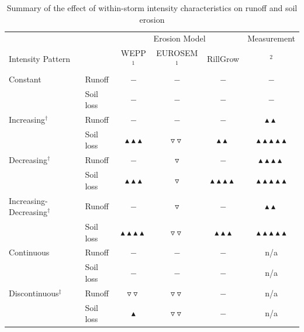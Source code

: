 \begin{table}
  \centering
  \caption{Summary of the effect of within-storm intensity characteristics on
runoff and soil erosion}
  \label{tab:SimulationSummary}
    \begin{tabular}{llcccc}
    \toprule
    & & \multicolumn{3}{c}{Erosion Model} & Measurement \\
    \cmidrule(rl){3-5} \cmidrule(rl){6-6}
    Intensity Pattern & & WEPP$^1$ & EUROSEM$^1$ & RillGrow &
\citet{parsons2006-68}$^2$\\
    \midrule
    \midrule
    Constant & Runoff & $-$ & $-$ & $-$ & $-$ \\
             & Soil loss & $-$ & $-$ & $-$ & $-$ \\
    \midrule
    Increasing$^\dagger$ & Runoff & $-$ & $-$ & $-$ &
$\blacktriangle\blacktriangle$ \\
                         & Soil loss &
$\blacktriangle\blacktriangle\blacktriangle$ & $\triangledown\triangledown$
& $\blacktriangle\blacktriangle$ &
$\blacktriangle\blacktriangle\blacktriangle\blacktriangle\blacktriangle$ \\
    \midrule
    Decreasing$^\dagger$ & Runoff & $-$ & $\triangledown$ & $-$ &
$\blacktriangle\blacktriangle\blacktriangle\blacktriangle$\\
                         & Soil loss &
$\blacktriangle\blacktriangle\blacktriangle$ & $\triangledown$ &
$\blacktriangle\blacktriangle\blacktriangle\blacktriangle$ &
$\blacktriangle\blacktriangle\blacktriangle\blacktriangle\blacktriangle$ \\
    \midrule
    Increasing-Decreasing$^\dagger$ & Runoff & $-$ & $\triangledown$ & $-$ &
$\blacktriangle\blacktriangle$ \\
                                    & Soil loss &
$\blacktriangle\blacktriangle\blacktriangle\blacktriangle$ &
$\triangledown\triangledown$ & $\blacktriangle\blacktriangle\blacktriangle$
& $\blacktriangle\blacktriangle\blacktriangle\blacktriangle\blacktriangle$ \\
    \midrule
    \midrule
    Continuous & Runoff & $-$ & $-$ & $-$ & n/a \\
               & Soil loss & $-$ & $-$ & $-$ & n/a \\
    \midrule
    Discontinuous$^\ddagger$ & Runoff & $\triangledown\triangledown$ &
$\triangledown\triangledown$ & $-$ & n/a \\
                             & Soil loss & $\blacktriangle$&
$\triangledown\triangledown$ & $-$ & n/a\\

\end{tabular}
\end{table}
